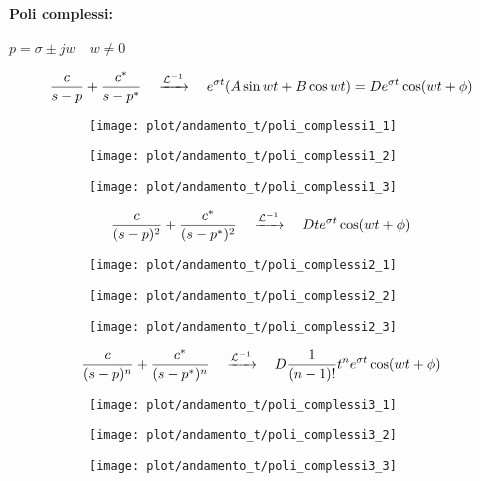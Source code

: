 \documentclass[../main.tex]{subfiles}
\begin{document}
	\paragraph{Poli complessi:} $ p = \sigma \pm jw \quad w \neq 0 $
	\begin{figure}[H]
		\[ \frac{c}{s-p} + \frac{c^*}{s-p^*}  \quad \xrightarrow{\mathcal{L}^{-1}} \quad  e^{\sigma t} (A \sin wt + B \cos wt) = D e^{\sigma t} \cos (wt + \phi)  \]
		\centering
		\begin{subfigure}{0.3\textwidth}
			\texttt{[image: plot/andamento\_t/poli\_complessi1\_1]}
		\end{subfigure}
		\begin{subfigure}{0.3\textwidth}
			\texttt{[image: plot/andamento\_t/poli\_complessi1\_2]}
		\end{subfigure}
		\begin{subfigure}{0.3\textwidth}
			\texttt{[image: plot/andamento\_t/poli\_complessi1\_3]}
		\end{subfigure}
	\end{figure}
	\begin{figure}[H]
		\[ \frac{c}{(s-p)^2} + \frac{c^*}{(s-p^*)^2}  \quad \xrightarrow{\mathcal{L}^{-1}} \quad  D t e^{\sigma t} \cos (wt + \phi) \]
		\centering
		\begin{subfigure}{0.3\textwidth}
			\texttt{[image: plot/andamento\_t/poli\_complessi2\_1]}
		\end{subfigure}
		\begin{subfigure}{0.3\textwidth}
			\texttt{[image: plot/andamento\_t/poli\_complessi2\_2]}
		\end{subfigure}
		\begin{subfigure}{0.3\textwidth}
			\texttt{[image: plot/andamento\_t/poli\_complessi2\_3]}
		\end{subfigure}
	\end{figure}
	\begin{figure}[H]
		\[ \frac{c}{(s-p)^n} + \frac{c^*}{(s-p^*)^n}  \quad \xrightarrow{\mathcal{L}^{-1}} \quad  D \frac{1}{(n-1)!} t^n e^{\sigma t} \cos (wt + \phi) \]
		\centering
		\begin{subfigure}{0.3\textwidth}
			\texttt{[image: plot/andamento\_t/poli\_complessi3\_1]}
		\end{subfigure}
		\begin{subfigure}{0.3\textwidth}
			\texttt{[image: plot/andamento\_t/poli\_complessi3\_2]}
		\end{subfigure}
		\begin{subfigure}{0.3\textwidth}
			\texttt{[image: plot/andamento\_t/poli\_complessi3\_3]}
		\end{subfigure}
	\end{figure}
\end{document}
